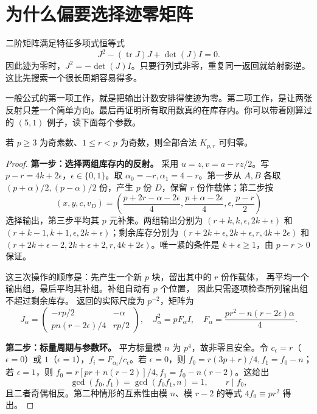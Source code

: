 \section{为什么偏要选择迹零矩阵}
二阶矩阵满足特征多项式恒等式
\[J^2-(\operatorname{tr}J)J+\det(J)I=0.
\]
因此迹为零时，$J^2=-\det(J)I$。只要行列式非零，重复同一返回就给射影逆。这比先搜索一个很长周期容易得多。

一般公式的第一项工作，就是把输出计数安排得使迹为零。第二项工作，是让两张反射只差一个简单方向。最后再证明所有取用数真的在库存内。你可以带着刚算过的 $(5,1)$ 例子，读下面每个参数。
\begin{proposition}[奇数余量的全部合法核心]\label{prop:odd}
若 $p\ge3$ 为奇素数、$1\le r<p$ 为奇数，则全部合法 $K_{p,r}$ 可归零。
\end{proposition}
\begin{proof}

\par\noindent\textbf{第一步：选择两组库存内的反射。}
采用 $u=z,v=a-rz/2$。写 $p-r=4k+2\epsilon$，$\epsilon\in\{0,1\}$。取 $\alpha_0=-r,\alpha_1=4-r$。第一步从 $A,B$ 各取 $(p+\alpha)/2,(p-\alpha)/2$ 份，产生 $p$ 份 $D$，保留 $r$ 份作载体；第二步按
\[
(x,y,c,v_D)=\left(\frac{p+2r-\alpha-2\epsilon}{4},\frac{p+\alpha-2\epsilon}{4},\epsilon,\frac{p-r}{2}\right)
\]
选择输出，第三步平均其 $p$ 元补集。两组输出分别为 $(r+k,k,\epsilon,2k+\epsilon)$ 和 $(r+k-1,k+1,\epsilon,2k+\epsilon)$；剩余库存分别为 $(r+2k+\epsilon,2k+\epsilon,r,4k+2\epsilon)$ 和 $(r+2k+\epsilon-2,2k+\epsilon+2,r,4k+2\epsilon)$。唯一紧的条件是 $k+\epsilon\ge1$，由 $p-r>0$ 保证。

这三次操作的顺序是：先产生一个新 $p$ 块，留出其中的 $r$ 份作载体，
再平均一个输出组，最后平均其补组。补组自动有 $p$ 个位置，
因此只需逐项检查所列输出组不超过剩余库存。
返回的实际尺度为 $p^{-2}$，矩阵为
\[
J_\alpha=\begin{pmatrix}-rp/2&-\alpha\\pn(r-2\epsilon)/4&rp/2\end{pmatrix},
\quad J_\alpha^2=pF_\alpha I,\quad F_\alpha=\frac{pr^2-n(r-2\epsilon)\alpha}{4}.
\]

\par\noindent\textbf{第二步：标量周期与参数环。}
平方标量模 $n$ 为 $p^4$，故非零且安全。令 $c_\epsilon=r$（$\epsilon=0$）或 $1$（$\epsilon=1$），$f_i=F_{\alpha_i}/c_\epsilon$。若 $\epsilon=0$，则 $f_0=r(3p+r)/4,f_1=f_0-n$；若 $\epsilon=1$，则 $f_0=r[pr+n(r-2)]/4,f_1=f_0-n(r-2)$。这给出
\[
\gcd(f_0,f_1)=\gcd(f_0f_1,n)=1,\qquad r\mid f_0,
\]
且二者奇偶相反。第二种情形的互素性由模 $n$、模 $r-2$ 的等式 $4f_0\equiv pr^2$ 得出。


\end{proof}
